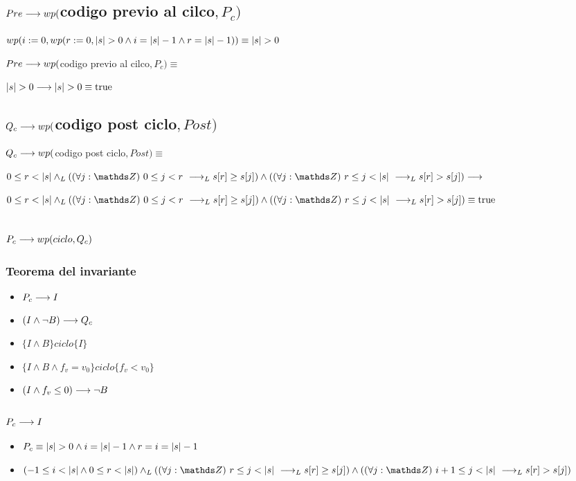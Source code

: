 \documentclass{article}
\begin{document}
\subsection*{$Pre \longrightarrow wp($codigo previo al cilco$,P_{c})$}

    $wp(i:=0, wp(r:= 0, |s| > 0 \wedge i = |s|-1 \wedge r = |s|-1)) \equiv |s| > 0$

    $Pre \longrightarrow wp($codigo previo al cilco$,P_{c}) \equiv$

    $ |s| > 0 \longrightarrow |s| > 0 \equiv \mathrm{true} $

\subsection*{$Q_{c} \longrightarrow wp($codigo post ciclo$,Post)$}

    $Q_{c} \longrightarrow wp($codigo post ciclo$,Post) \equiv$

    $0 \leq r < \longitud{s} \yLuego (\paraTodo{j}{0}{r} \implicaLuego s[r] \geq s[j]) \wedge (\paraTodo{j}{r}{\longitud{s}}\implicaLuego s[r] > s[j]) \implica$

    $0 \leq r < \longitud{s} \yLuego (\paraTodo{j}{0}{r} \implicaLuego s[r] \geq s[j]) \wedge (\paraTodo{j}{r}{\longitud{s}}\implicaLuego s[r] > s[j]) \equiv \True$

\subsection*{$P_{c} \longrightarrow wp(ciclo, Q_{c})$}
\subsubsection*{Teorema del invariante}
\begin{itemize}
    \item $ P_{c} \longrightarrow I $
    \item $ (I \wedge \neg B) \longrightarrow Q_{c} $
    \item $ \{I \wedge B\} ciclo \{I\} $
    \item $ \{I \wedge B \wedge f_{v}=v_{0}\} ciclo \{f_{v}<v_{0}\} $
    \item $ (I \wedge f_{v} \leq 0) \longrightarrow \neg B$
\end{itemize}
\subsubsection*{$ P_{c} \longrightarrow I $}

\begin{itemize}
    \item $P_{c}    \equiv |s| > 0 \wedge i = |s| - 1 \wedge r = i = |s| - 1$
    \item $(-1 \leq i < \longitud{s} \wedge 0 \leq r < \longitud{s}) \yLuego (\paraTodo{j}{r}{\longitud{s}} \implicaLuego s[r] \geq s[j]) \wedge (\paraTodo{j}{i+1}{\longitud{s}}\implicaLuego s[r] > s[j])$
\end{itemize}
\end{document}
